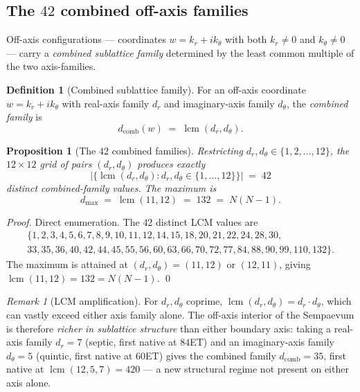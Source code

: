 \documentclass[11pt,a4paper]{article}
\newtheorem{proposition}[theorem]{Proposition}
\theoremstyle{definition}
\newtheorem{definition}[theorem]{Definition}
\theoremstyle{remark}
\newtheorem{remark}[theorem]{Remark}
\DeclareMathOperator{\lcm}{lcm}
\begin{document}
\subsection{The $42$ combined off-axis families}\label{subsec:42-combined}

Off-axis configurations --- coordinates $w = k_{r} + i k_{\theta}$ with both $k_{r}\neq 0$ and $k_{\theta}\neq 0$ --- carry a \emph{combined sublattice family} determined by the least common multiple of the two axis-families.

\begin{definition}[Combined sublattice family]\label{def:combined}
For an off-axis coordinate $w = k_{r} + i k_{\theta}$ with real-axis family $d_{r}$ and imaginary-axis family $d_{\theta}$, the \emph{combined family} is
\[
d_{\text{comb}}(w) \;=\; \lcm(d_{r}, d_{\theta}).
\]
\end{definition}

\begin{proposition}[The $42$ combined families]\label{prop:42}
Restricting $d_{r}, d_{\theta} \in \{1,2,\ldots,12\}$, the $12\times 12$ grid of pairs $(d_{r}, d_{\theta})$ produces exactly
\[
|\{\lcm(d_{r}, d_{\theta}) : d_{r}, d_{\theta}\in\{1,\ldots,12\}\}| \;=\; 42
\]
distinct combined-family values. The maximum is
\[
d_{\max} \;=\; \lcm(11,12) \;=\; 132 \;=\; N(N-1).
\]
\end{proposition}

\begin{proof}
Direct enumeration. The $42$ distinct LCM values are
\begin{multline*}
\{1, 2, 3, 4, 5, 6, 7, 8, 9, 10, 11, 12, 14, 15, 18, 20, 21, 22, 24, 28, 30,\\
33, 35, 36, 40, 42, 44, 45, 55, 56, 60, 63, 66, 70, 72, 77, 84, 88, 90, 99, 110, 132\}.
\end{multline*}
The maximum is attained at $(d_{r}, d_{\theta}) = (11, 12)$ or $(12, 11)$, giving $\lcm(11,12) = 132 = N(N{-}1)$.
\qed
\end{proof}

\begin{remark}[LCM amplification]
For $d_{r}, d_{\theta}$ coprime, $\lcm(d_{r}, d_{\theta}) = d_{r}\cdot d_{\theta}$, which can vastly exceed either axis family alone. The off-axis interior of the Sempaevum is therefore \emph{richer in sublattice structure} than either boundary axis: taking a real-axis family $d_{r}=7$ (septic, first native at $84$ET) and an imaginary-axis family $d_{\theta}=5$ (quintic, first native at $60$ET) gives the combined family $d_{\text{comb}}=35$, first native at $\lcm(12,5,7) = 420$ --- a new structural regime not present on either axis alone.
\end{remark}
\end{document}

